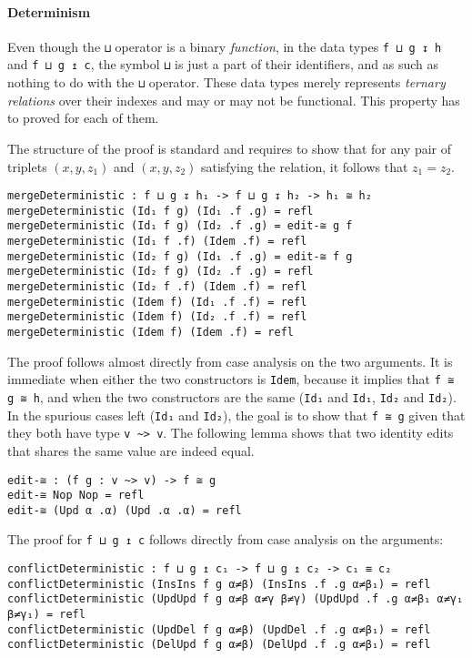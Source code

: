 \documentclass[../Thesis.tex]{subfiles}
\begin{document}
	\paragraph{Determinism}
	\label{par:Determinism}
	Even though the \texttt{⊔} operator is a binary \emph{function}, 
	in the data types \texttt{f ⊔ g ↧ h} and \texttt{f ⊔ g ↥ c}, the symbol
	\texttt{⊔} is just a part of their identifiers, and as such as nothing to
	do with the \texttt{⊔} operator.
	These data types merely represents \emph{ternary relations} over their 
	indexes and may or may not be functional.
	This property has to proved for each of them.
	
	The structure of the proof is standard and requires to show that for any 
	pair of triplets $(x, y, z_1)$ and $(x, y, z_2)$ satisfying
	the relation, it follows that $z_1 = z_2$.
	
\begin{verbatim}
mergeDeterministic : f ⊔ g ↧ h₁ -> f ⊔ g ↧ h₂ -> h₁ ≅ h₂
mergeDeterministic (Id₁ f g) (Id₁ .f .g) = refl
mergeDeterministic (Id₁ f g) (Id₂ .f .g) = edit-≅ g f
mergeDeterministic (Id₁ f .f) (Idem .f) = refl
mergeDeterministic (Id₂ f g) (Id₁ .f .g) = edit-≅ f g
mergeDeterministic (Id₂ f g) (Id₂ .f .g) = refl
mergeDeterministic (Id₂ f .f) (Idem .f) = refl
mergeDeterministic (Idem f) (Id₁ .f .f) = refl
mergeDeterministic (Idem f) (Id₂ .f .f) = refl
mergeDeterministic (Idem f) (Idem .f) = refl
\end{verbatim}

	The proof follows almost directly from case analysis on the two arguments.
	It is immediate when either the two constructors is \texttt{Idem}, because
	it implies that \texttt{f ≅ g ≅ h}, and when the two constructors are the 
	same (\texttt{Id₁} and \texttt{Id₁}, \texttt{Id₂} and \texttt{Id₂}).
	In the spurious cases left (\texttt{Id₁} and \texttt{Id₂}), the goal
	is to show that \texttt{f ≅ g} 
	given that they both have type \texttt{v \textasciitilde> v}.
	The following lemma shows that two identity edits that shares the same 
	value are indeed equal.
	
\begin{verbatim}
edit-≅ : (f g : v ~> v) -> f ≅ g
edit-≅ Nop Nop = refl
edit-≅ (Upd α .α) (Upd .α .α) = refl
\end{verbatim}	
	
	The proof for \texttt{f ⊔ g ↥ c} follows directly from case analysis on the 
	arguments:
	
\begin{verbatim}
conflictDeterministic : f ⊔ g ↥ c₁ -> f ⊔ g ↥ c₂ -> c₁ ≡ c₂
conflictDeterministic (InsIns f g α≠β) (InsIns .f .g α≠β₁) = refl
conflictDeterministic (UpdUpd f g α≠β α≠γ β≠γ) (UpdUpd .f .g α≠β₁ α≠γ₁ β≠γ₁) = refl
conflictDeterministic (UpdDel f g α≠β) (UpdDel .f .g α≠β₁) = refl
conflictDeterministic (DelUpd f g α≠β) (DelUpd .f .g α≠β₁) = refl
\end{verbatim}	
\end{document}
